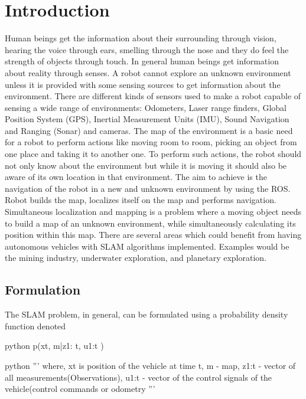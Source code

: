 \section{Introduction}
Human beings get the information about their surrounding through vision, hearing the voice through ears, smelling through the nose and they do feel the strength of objects through touch. In general human beings get information about reality through senses. A robot cannot explore an unknown environment unless it is provided with some sensing sources to get information about the environment. There are different kinds of sensors used to make a robot capable of sensing a wide range of environments: Odometers, Laser range finders, Global Position System (GPS), Inertial Measurement Units (IMU), Sound Navigation and Ranging (Sonar) and cameras. The map of the environment is a basic need for a robot to perform actions like moving room to room, picking an object from one place and taking it to another one. To perform such actions, the robot should not only know about the environment but while it is moving it should also be aware of its own location in that environment. The aim to achieve is the navigation of the robot in a new and unknown environment by using the ROS. Robot builds the map, localizes itself on the map and performs navigation.
Simultaneous localization and mapping is a problem where a moving object needs to build a map of an unknown environment, while simultaneously calculating its position within this map. There are several areas which could benefit from having autonomous vehicles with SLAM algorithms implemented. Examples would be the mining industry, underwater exploration, and planetary exploration.\cite{ustintern}


\subsection{Formulation}
The SLAM problem, in general, can be formulated using a probability density function denoted \cite{ustintern}

\begin{mint}{python}
    p(xt, m|z1: t, u1:t )
\end{mint}

\begin{mint}{python}
'''
where, xt is  position of the vehicle at time t,
m       -  map,
z1:t    -  vector of all measurements(Observations),
u1:t    - vector of the control signals of the vehicle(control commands or odometry
'''
\end{mint}




